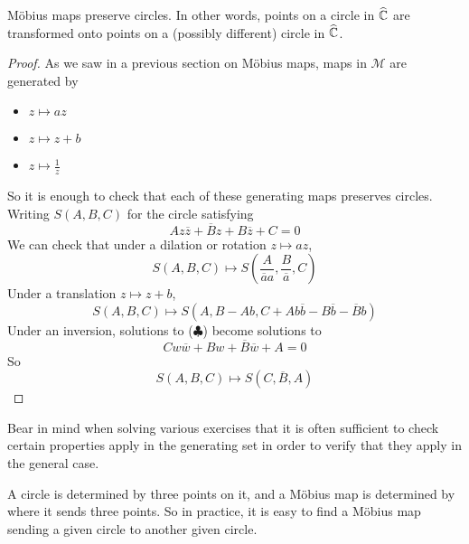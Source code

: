 \begin{theorem}
	M\"obius maps preserve circles.
	In other words, points on a circle in \(\widehat{\mathbb C}\) are transformed onto points on a (possibly different) circle in \(\widehat{\mathbb C}\).
\end{theorem}
\begin{proof}
	As we saw in a previous section on M\"obius maps, maps in \(\mathcal M\) are generated by
	\begin{itemize}
		\item \(z \mapsto az\)
		\item \(z \mapsto z + b\)
		\item \(z \mapsto \frac{1}{z}\)
	\end{itemize}
	So it is enough to check that each of these generating maps preserves circles.
	Writing \(S(A, B, C)\) for the circle satisfying
	\[
		Az\overline z + \overline B z + B \overline z + C = 0 \tag{\(\clubsuit\)}
	\]
	We can check that under a dilation or rotation \(z \mapsto az\),
	\[
		S(A, B, C) \mapsto S\left( \frac{A}{\overline a a}, \frac{B}{\overline a}, C \right)
	\]
	Under a translation \(z \mapsto z + b\),
	\[
		S(A, B, C) \mapsto S\left( A, B-Ab, C+Ab\overline b - B\overline b - \overline B b \right)
	\]
	Under an inversion, solutions to (\(\clubsuit\)) become solutions to
	\[
		Cw\overline w + Bw + \overline B\overline w + A = 0
	\]
	So
	\[
		S(A, B, C) \mapsto S(C, \overline B, A)
	\]
\end{proof}
Bear in mind when solving various exercises that it is often sufficient to check certain properties apply in the generating set in order to verify that they apply in the general case.

\begin{remark}
	A circle is determined by three points on it, and a M\"obius map is determined by where it sends three points.
	So in practice, it is easy to find a M\"obius map sending a given circle to another given circle.
\end{remark}

